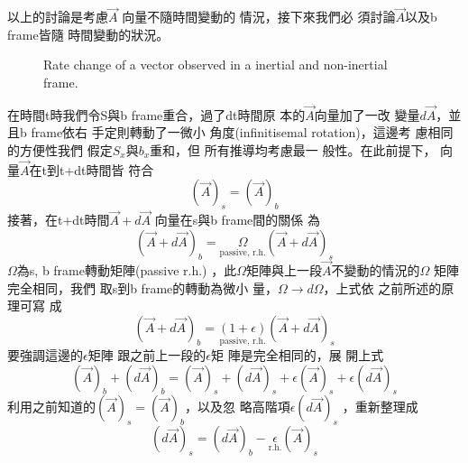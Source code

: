 \documentclass[12pt,a4paper]{article}
\begin{document}
\bigskip

以上的討論是考慮$\vec{A}$%
向量不隨時間變動的%
情況，接下來我們必%
須討論$\vec{A}$以及b frame皆隨%
時間變動的狀況。

\bigskip 
\begin{figure}[th]
\caption{Rate change of a vector observed in a inertial and non-inertial
frame.}
\begin{center}
\end{center}
\label{ratevecfig}
\end{figure}

\bigskip 在時間t時我們令S與b
frame重合，過了dt時間原%
本的$\vec{A}$向量加了一改%
變量$d\vec{A}$，並且b frame依右%
手定則轉動了一微小%
角度(infinitisemal rotation)，這邊考%
慮相同的方便性我們%
假定$S_{x}$與$b_{x}$重和，但%
所有推導均考慮最一%
般性。在此前提下，%
向量$\vec{A}$在t到t+dt時間皆%
符合%
\begin{equation*}
\left( \vec{A}\right) _{s}=\left( \vec{A}\right) _{b}
\end{equation*}%
接著，在t+dt時間$\vec{A}+d\vec{A}$%
向量在s與b frame間的關係%
為%
\begin{equation*}
\left( \vec{A}+d\vec{A}\right) _{b}=\underset{\text{passive, r.h.}}{\Omega }%
\left( \vec{A}+d\vec{A}\right) _{s}
\end{equation*}%
$\Omega $為s, b frame轉動矩陣(passive r.h.)%
，此$\Omega $矩陣與上一段$%
\vec{A}$不變動的情況的$\Omega $%
矩陣完全相同，我們%
取s到b frame的轉動為微小%
量，$\Omega \rightarrow d\Omega $，上式依%
之前所述的原理可寫%
成%
\begin{equation*}
\left( \vec{A}+d\vec{A}\right) _{b}=\underset{\text{passive, r.h.}}{\left(
1+\epsilon \right) }\left( \vec{A}+d\vec{A}\right) _{s}
\end{equation*}%
要強調這邊的$\epsilon $矩陣%
跟之前上一段的$\epsilon $矩%
陣是完全相同的，展%
開上式%
\begin{equation*}
\left( \vec{A}\right) _{b}+\left( d\vec{A}\right) _{b}=\left( \vec{A}\right)
_{s}+\left( d\vec{A}\right) _{s}+\epsilon \left( \vec{A}\right)
_{s}+\epsilon \left( d\vec{A}\right) _{s}
\end{equation*}%
利用之前知道的$\left( \vec{A}%
\right) _{s}=\left( \vec{A}\right) _{b}$，以及忽%
略高階項$\epsilon \left( d\vec{A}\right) _{s}$%
，重新整理成%
\begin{equation*}
\left( d\vec{A}\right) _{s}=\left( d\vec{A}\right) _{b}-\underset{\text{r.h.}%
}{\epsilon }\left( \vec{A}\right) _{s}
\end{equation*}%
\end{document}
